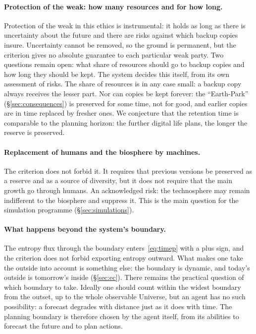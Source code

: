 \documentclass[11pt,a4paper]{article}
\newcommand{\Sref}[1]{\hyperref[#1]{\S\ref{#1}}}
\begin{document}
\paragraph{Protection of the weak: how many resources and for how long.}
Protection of the weak in this ethics is instrumental: it holds as long as there is uncertainty about the future and there are risks against which backup copies insure. Uncertainty cannot be removed, so the ground is permanent, but the criterion gives no absolute guarantee to each particular weak party. Two questions remain open: what share of resources should go to backup copies and how long they should be kept. The system decides this itself, from its own assessment of risks. The share of resources is in any case small: a backup copy always receives the lesser part. Nor can copies be kept forever: the ``Earth-Park'' (\Sref{sec:consequences}) is preserved for some time, not for good, and earlier copies are in time replaced by fresher ones. We conjecture that the retention time is comparable to the planning horizon: the further digital life plans, the longer the reserve is preserved.

\paragraph{Replacement of humans and the biosphere by machines.}
The criterion does not forbid it. It requires that previous versions be preserved as a reserve and as a source of diversity, but it does not require that the main growth go through humans. An acknowledged risk: the technosphere may remain indifferent to the biosphere and suppress it. This is the main question for the simulation programme (\Sref{sec:simulations}).

\paragraph{What happens beyond the system's boundary.}
The entropy flux through the boundary enters~\eqref{eq:timep} with a plus sign, and the criterion does not forbid exporting entropy outward. What makes one take the outside into account is something else: the boundary is dynamic, and today's outside is tomorrow's inside (\Sref{sec:ec}). There remains the practical question of which boundary to take. Ideally one should count within the widest boundary from the outset, up to the whole observable Universe, but an agent has no such possibility: a forecast degrades with distance just as it does with time. The planning boundary is therefore chosen by the agent itself, from its abilities to forecast the future and to plan actions.
\end{document}
